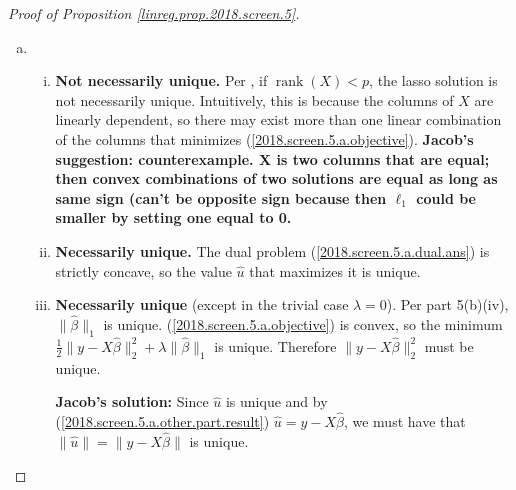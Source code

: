 \begin{proof}[Proof of Proposition \ref{linreg.prop.2018.screen.5}]
\begin{enumerate}[(a)]
Then since (\ref{2018.screen.5.a.other.part.result}) is a requirement for dual feasibility of \(u\) and strong duality applies, we have \(\hat{u} = y - X \hat{\beta}\).

\item

\begin{enumerate}[(i)]

\item \textbf{Not necessarily unique.} Per \citet{Tibshirani2013}, if \(\operatorname{rank}(X) < p\), the lasso solution is not necessarily unique. Intuitively, this is because the columns of \(X\) are linearly dependent, so there may exist more than one linear combination of the columns that minimizes (\ref{2018.screen.5.a.objective}). \textbf{Jacob's suggestion: counterexample. X is two columns that are equal; then convex combinations of two solutions are equal as long as same sign (can't be opposite sign because then \(\ell_1\) could be smaller by setting one equal to 0.}

\item \textbf{Necessarily unique.} The dual problem (\ref{2018.screen.5.a.dual.ans}) is strictly concave, so the value \(\hat{u}\) that maximizes it is unique.



\item \textbf{Necessarily unique} (except in the trivial case \(\lambda=0\)). Per part 5(b)(iv), \(\lVert \hat{\beta} \rVert_1\) is unique. (\ref{2018.screen.5.a.objective}) is convex, so the minimum \(\frac{1}{2} \lVert y - X \hat{\beta} \rVert_2^2 + \lambda \lVert \hat{\beta} \rVert_1\) is unique. Therefore \( \lVert y - X \hat{\beta} \rVert_2^2\) must be unique.

\textbf{Jacob's solution:} Since \(\hat{u}\) is unique and by (\ref{2018.screen.5.a.other.part.result}) \(\hat{u} = y - X \hat{\beta}\), we must have that \(\lVert \hat{u} \rVert = \lVert y - X \hat{\beta} \rVert\) is unique.



\end{enumerate}
\end{enumerate}
\end{proof}
